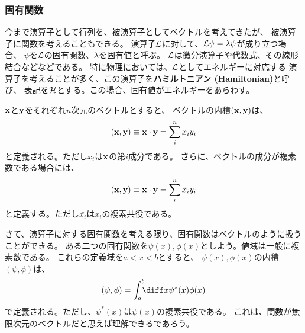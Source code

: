 \subsubsection{固有関数}

今まで演算子として行列を、被演算子としてベクトルを考えてきたが、
被演算子に関数を考えることもできる。
演算子$\cal{L}$に対して、$\cal{L} \psi = \lambda \psi$が成り立つ場合、
$\psi$を$\cal{L}$の固有関数、$\lambda$を固有値と呼ぶ。
$\cal{L}$は微分演算子や代数式、その線形結合などなどである。
特に物理においては、$\cal{L}$としてエネルギーに対応する
演算子を考えることが多く、この演算子を{\bf ハミルトニアン (Hamiltonian)}と呼び、
表記を$\cal H$とする。この場合、固有値がエネルギーをあらわす。


${\bf x}$と${\bf y}$をそれぞれ$n$次元のベクトルとすると、
ベクトルの内積$({\bf x},{\bf y})$は、
\begin{equation}
  ({\bf x},{\bf y}) \equiv {\bf x} \cdot {\bf y} = \sum_i^n x_i y_i
\end{equation}
と定義される。ただし$x_i$は${\bf x}$の第$i$成分である。
さらに、ベクトルの成分が複素数である場合には、
\begin{equation}
  ({\bf x},{\bf y}) \equiv \bar{{\bf x}} \cdot {\bf y} = \sum_i^n \bar{x_i} y_i
\end{equation}
と定義する。ただし$\bar{x_i}$は$x_i$の複素共役である。

さて、演算子に対する固有関数を考える限り、固有関数はベクトルのように扱うことができる。
ある二つの固有関数を$\psi(x),\phi(x)$としよう。値域は一般に複素数である。
これらの定義域を$a < x < b$とすると、
$\psi(x),\phi(x)$の内積$(\psi,\phi)$は、
\begin{equation}
  (\psi,\phi) = \int_{a}^{b} \!\!\! \diff x \psi^*(x) \phi(x)
\end{equation}
で定義される。ただし、$\psi^*(x)$は$\psi(x)$の複素共役である。
これは、関数が無限次元のベクトルだと思えば理解できるであろう。


